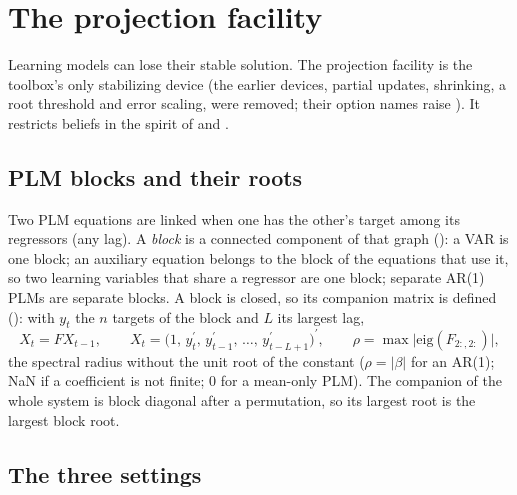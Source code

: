 \documentclass[11pt,a4paper]{article}
\newcommand{\transp}{^{\prime}}
\begin{document}
\section{The projection facility}\label{sec:facility}

Learning models can lose their stable solution. The projection facility is the toolbox's only
stabilizing device (the earlier devices, partial updates, shrinking, a root threshold and error
scaling, were removed; their option names raise ). It restricts
beliefs in the spirit of \citet{marcet1989} and \citet{evans2001}.

\subsection{PLM blocks and their roots}\label{sec:blocks}

Two PLM equations are linked when one has the other's target among its regressors (any lag). A
\emph{block} is a connected component of that graph (): a VAR is one block;
an auxiliary equation belongs to the block of the equations that use it, so two learning variables
that share a regressor are one block; separate AR(1) PLMs are separate blocks. A block is closed,
so its companion matrix is defined (): with $y_t$ the $n$ targets of the
block and $L$ its largest lag,
\begin{equation}\label{eq:companion}
  X_t = F X_{t-1},\qquad X_t = \bigl(1,\, y_t\transp,\, y_{t-1}\transp,\, \dots,\, y_{t-L+1}\transp\bigr)\transp,
  \qquad \rho = \max\bigl|\mathrm{eig}(F_{2:,2:})\bigr|,
\end{equation}
the spectral radius without the unit root of the constant ($\rho = |\beta|$ for an AR(1); NaN if a
coefficient is not finite; 0 for a mean-only PLM). The companion of the whole system is block
diagonal after a permutation, so its largest root is the largest block root.

\subsection{The three settings}\label{sec:facilitysettings}
\end{document}
